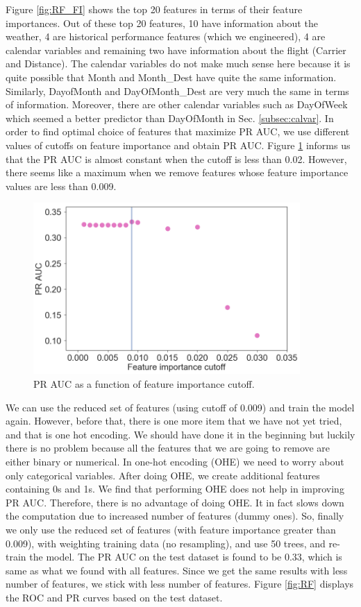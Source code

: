 \documentclass[12pt]{article}
\begin{document}
Figure \ref{fig:RF_FI} shows the top 20 features in terms of their feature importances. Out of these top 20 features, 10 have information about the weather, 4 are historical performance features (which we engineered), 4 are calendar variables and remaining two have information about the flight (Carrier and Distance). The calendar variables do not make much sense here because it is quite possible that Month and Month\_Dest have quite the same information. Similarly, DayofMonth and DayOfMonth\_Dest are very much the same in terms of information. Moreover, there are other calendar variables such as DayOfWeek which seemed a better predictor than DayOfMonth in Sec. \ref{subsec:calvar}. In order to find optimal choice of features that maximize PR AUC, we use different values of cutoffs on feature importance and obtain PR AUC. Figure \ref{fig:RF_FI_Cutoff} informs us that the PR AUC is almost constant when the cutoff is less than 0.02. However, there seems like a maximum when we remove features whose feature importance values are less than 0.009. 
\begin{figure}[!h]
\begin{center}
\includegraphics[width=4in]{RF_FI_Cutoff.pdf}
\end{center}
\caption{\label{fig:RF_FI_Cutoff}
PR AUC as a function of feature importance cutoff.}
\end{figure}
We can use the reduced set of features (using cutoff of 0.009) and train the model again. However, before that, there is one more item that we have not yet tried, and that is one hot encoding. We should have done it in the beginning but luckily there is no problem because all the features that we are going to remove are either binary or numerical. In one-hot encoding (OHE) we need to worry about only categorical variables. After doing OHE, we create additional features containing 0s and 1s. We find that performing OHE does not help in improving PR AUC. Therefore, there is no advantage of doing OHE. It in fact slows down the computation due to increased number of features (dummy ones). So, finally we only use the reduced set of features (with feature importance greater than 0.009), with weighting training data (no resampling), and use 50 trees, and re-train the model. The PR AUC on the test dataset is found to be 0.33, which is same as what we found with all features. Since we get the same results with less number of features, we stick with less number of features. Figure \ref{fig:RF} displays the ROC and PR curves based on the test dataset.
\end{document}
